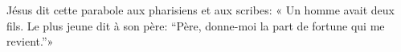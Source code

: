 \encetemps Jésus dit cette parabole aux pharisiens et aux scribes:
	« Un homme avait deux fils.
Le plus jeune dit à son père:
	“Père, donne-moi la part de fortune qui me revient.”»
